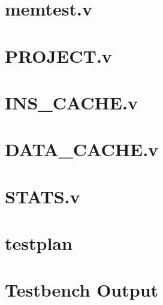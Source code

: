 \documentclass{article}
\begin{document}
\newenvironment{frcseries}{\fontfamily{frc}\selectfont}{}
\newcommand{\textfrc}[1]{{\frcseries#1}}
\newcommand{\mathfrc}[1]{\text{\textfrc{#1}}}

\section{memtest.v}

\newpage 

\section{PROJECT.v}

\newpage 

\section{INS\_CACHE.v}

\newpage 

\section{DATA\_CACHE.v}

\newpage 

\section{STATS.v}

\newpage 


\section{testplan}

\newpage 

\section{Testbench Output}

\end{document}
